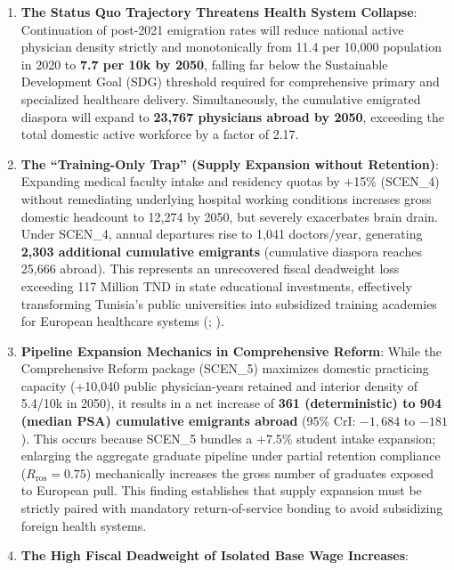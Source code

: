 \documentclass[
  11pt,
  a4paper]{article}
\providecommand{\tightlist}{%
  \setlength{\itemsep}{0pt}\setlength{\parskip}{0pt}}
\begin{document}
\begin{enumerate}
\def\labelenumi{\arabic{enumi}.}
\tightlist
\item
  \textbf{The Status Quo Trajectory Threatens Health System Collapse}:
  Continuation of post-2021 emigration rates will reduce national active
  physician density strictly and monotonically from 11.4 per 10,000
  population in 2020 to \textbf{7.7 per 10k by 2050}, falling far below
  the Sustainable Development Goal (SDG) threshold required for
  comprehensive primary and specialized healthcare delivery.
  Simultaneously, the cumulative emigrated diaspora will expand to
  \textbf{23,767 physicians abroad by 2050}, exceeding the total
  domestic active workforce by a factor of 2.17.
\item
  \textbf{The ``Training-Only Trap'' (Supply Expansion without
  Retention)}: Expanding medical faculty intake and residency quotas by
  +15\% (SCEN\_4) without remediating underlying hospital working
  conditions increases gross domestic headcount to 12,274 by 2050, but
  severely exacerbates brain drain. Under SCEN\_4, annual departures
  rise to 1,041 doctors/year, generating \textbf{2,303 additional
  cumulative emigrants} (cumulative diaspora reaches 25,666 abroad).
  This represents an unrecovered fiscal deadweight loss exceeding 117
  Million TND in state educational investments, effectively transforming
  Tunisia's public universities into subsidized training academies for
  European healthcare systems (; ).
\item
  \textbf{Pipeline Expansion Mechanics in Comprehensive Reform}: While
  the Comprehensive Reform package (SCEN\_5) maximizes domestic
  practicing capacity (+10,040 public physician-years retained and
  interior density of 5.4/10k in 2050), it results in a net increase of
  \textbf{361 (deterministic) to 904 (median PSA) cumulative emigrants
  abroad} (95\% CrI: \(-1,684\) to \(-181\)). This occurs because
  SCEN\_5 bundles a +7.5\% student intake expansion; enlarging the
  aggregate graduate pipeline under partial retention compliance
  (\(R_{\text{ros}} = 0.75\)) mechanically increases the gross number of
  graduates exposed to European pull. This finding establishes that
  supply expansion must be strictly paired with mandatory
  return-of-service bonding to avoid subsidizing foreign health systems.
\item
  \textbf{The High Fiscal Deadweight of Isolated Base Wage Increases}:

\end{enumerate}
\end{document}
